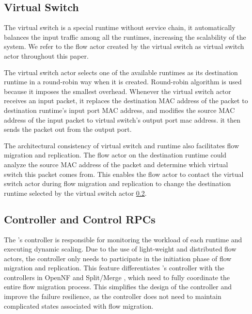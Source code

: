 \subsection{Virtual Switch}

The virtual switch is a special runtime without service chain, it automatically balances the input traffic among all the runtimes, increasing the scalability of the system. We refer to the flow actor created by the virtual switch as virtual switch actor throughout this paper.

The virtual switch actor selects one of the available runtimes as its destination runtime in a round-robin way when it is created. Round-robin algorithm is used because it imposes the smallest overhead. Whenever the virtual switch actor receives an input packet, it replaces the destination MAC address of the packet to destination runtime's input port MAC address, and modifies the source MAC address of the input packet to virtual switch's output port mac address. it then sends the packet out from the output port.

The architectural consistency of virtual switch and runtime also facilitates flow migration and replication. The flow actor on the destination runtime could analyze the source MAC address of the packet and determine which virtual switch this packet comes from. This enables the flow actor to contact the virtual switch actor during flow migration and replication to change the destination runtime selected by the virtual switch actor \ref{}.

\subsection{Controller and Control RPCs}


The \nfactor's controller is responsible for monitoring the workload of each runtime and executing dynamic scaling. Due to the use of light-weight and distributed flow actors, the controller only needs to participate in the initiation phase of flow migration and replication. This feature differentiates \nfactor's controller with the controllers in OpenNF \cite{gember2015opennf} and Split/Merge \cite{rajagopalan2013split}, which need to fully coordinate the entire flow migration process. This simplifies the design of the controller and improve the failure resilience, as the controller does not need to maintain complicated states associated with flow migration.

